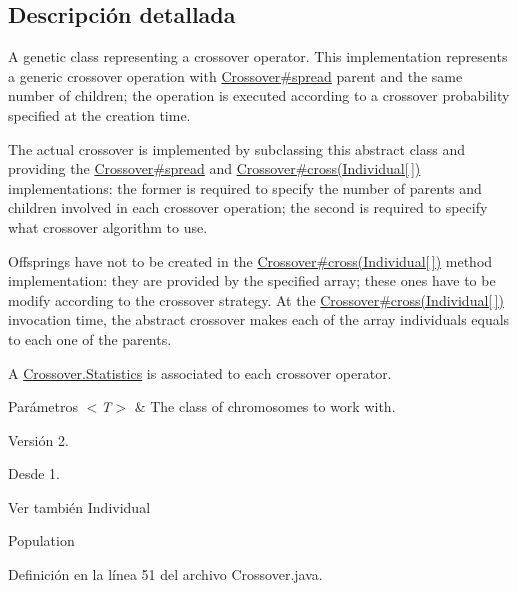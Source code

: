 \subsection{Descripción detallada}
A genetic class representing a crossover operator. This implementation represents a generic crossover operation with \hyperlink{}{Crossover\#spread} parent and the same number of children; the operation is executed according to a crossover probability specified at the creation time. 

The actual crossover is implemented by subclassing this abstract class and providing the \hyperlink{}{Crossover\#spread} and \hyperlink{}{Crossover\#cross(\-Individual\mbox{[}$\,$\mbox{]})} implementations\-: the former is required to specify the number of parents and children involved in each crossover operation; the second is required to specify what crossover algorithm to use. 

Offsprings have not to be created in the \hyperlink{}{Crossover\#cross(\-Individual\mbox{[}$\,$\mbox{]})} method implementation\-: they are provided by the specified array; these ones have to be modify according to the crossover strategy. At the \hyperlink{}{Crossover\#cross(\-Individual\mbox{[}$\,$\mbox{]})} invocation time, the abstract crossover makes each of the array individuals equals to each one of the parents. 

A \hyperlink{}{Crossover.\-Statistics} is associated to each crossover operator.


\begin{DoxyParams}{Parámetros}
{\em $<$\-T$>$} & The class of chromosomes to work with.\\
\hline
\end{DoxyParams}
\begin{DoxyVersion}{Versión}
2. 
\end{DoxyVersion}
\begin{DoxySince}{Desde}
1.
\end{DoxySince}
\begin{DoxySeeAlso}{Ver también}
Individual 

Population 
\end{DoxySeeAlso}


Definición en la línea 51 del archivo Crossover.\-java.



